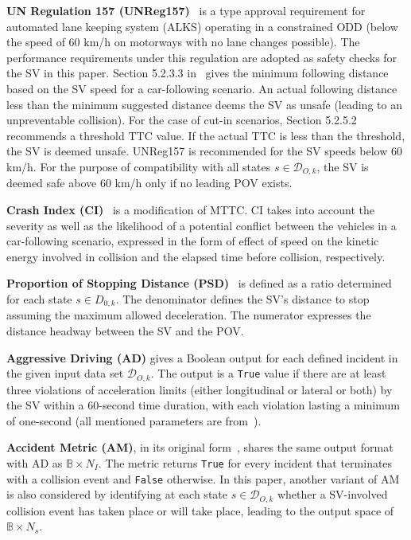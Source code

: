\documentclass[journal]{IEEEtran}
\begin{document}
\textbf{UN Regulation 157 (UNReg157)}~\cite{united2020proposal} is a type approval requirement for automated lane keeping system (ALKS) operating in a constrained ODD (below the speed of 60 km/h on motorways with no lane changes possible). The performance requirements under this regulation are adopted as safety checks for the SV in this paper. Section 5.2.3.3 in~\cite{united2020proposal} gives the minimum following distance based on the SV speed for a car-following scenario. An actual following distance less than the minimum suggested distance deems the SV as unsafe (leading to an unpreventable collision). For the case of cut-in scenarios, Section 5.2.5.2 recommends a threshold TTC value. If the actual TTC is less than the threshold, the SV is deemed unsafe. UNReg157 is recommended for the SV speeds below 60 km/h. For the purpose of compatibility with all states $s \in \mathcal{D}_{O,k}$, the SV is deemed safe above 60 km/h only if no leading POV exists.

\textbf{Crash Index (CI)}~\cite{Ozbay2008Derivation} is a modification of MTTC. CI takes into account the severity as well as the likelihood of a potential conflict between the vehicles in a car-following scenario, expressed in the form of effect of speed on the kinetic energy involved in collision and the elapsed time before collision, respectively. 

\textbf{Proportion of Stopping Distance (PSD)}~\cite{astarita2019traffic} is defined as a ratio determined for each state $s \in {D}_{0,k}$. The denominator defines the SV's distance to stop assuming the maximum allowed deceleration. The numerator expresses the distance headway between the SV and the POV.

\textbf{Aggressive Driving (AD)} gives a Boolean output for each defined incident in the given input data set $\mathcal{D}_{O, k}$. The output is a \texttt{True} value if there are at least three violations of acceleration limits (either longitudinal or lateral or both) by the SV within a 60-second time duration, with each violation lasting a minimum of one-second (all mentioned parameters are from~\cite{wishart2020driving}).

\textbf{Accident Metric (AM)}, in its original form~\cite{otte2003scientific}, shares the same output format with AD as $\mathbb{B} \times N_I$. The metric returns \texttt{True} for every incident that terminates with a collision event and \texttt{False} otherwise. In this paper, another variant of AM is also considered by identifying at each state $s \in \mathcal{D}_{O, k}$ whether a SV-involved collision event has taken place or will take place, leading to the output space of $\mathbb{B} \times N_s$. 
\end{document}
